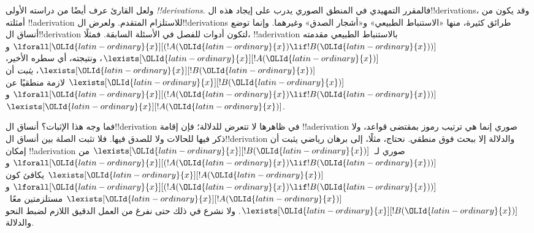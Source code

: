 \documentclass[../../../include/open-logic-section]{subfiles}
\begin{document}
ولعل القارئ عرف أيضًا من دراسته الأولى \emph{!!{derivation}s}.
فالمقرر التمهيدي في المنطق الصوري يدرب على إيجاد هذه
ال!!{derivation}s، وقد يكون من أمثلته !!a{derivation} للاستلزام
المتقدم. ولعرض ال!!{derivation}s طرائق كثيرة، منها «الاستنباط
الطبيعي» و«أشجار الصدق» وغيرهما. وإنما توضع أنساق ال!!{derivation}
لتكون أدوات للفصل في الأسئلة السابقة. فمثلًا، !!a{derivation}
بالاستنباط الطبيعي مقدمته
$\lforall[{\OLId{latin-ordinary}{x}}][(!A({\OLId{latin-ordinary}{x}}) \lif !B({\OLId{latin-ordinary}{x}}))]$ و$\lexists[{\OLId{latin-ordinary}{x}}][!A({\OLId{latin-ordinary}{x}})]$،
ونتيجته، أي سطره الأخير، $\lexists[{\OLId{latin-ordinary}{x}}][!B({\OLId{latin-ordinary}{x}})]$، \emph{يثبت} أن
$\lexists[{\OLId{latin-ordinary}{x}}][!B({\OLId{latin-ordinary}{x}})]$ لازمة منطقيًا عن
$\lforall[{\OLId{latin-ordinary}{x}}][(!A({\OLId{latin-ordinary}{x}}) \lif !B({\OLId{latin-ordinary}{x}}))]$ و$\lexists[{\OLId{latin-ordinary}{x}}][!A({\OLId{latin-ordinary}{x}})]$.

فما وجه هذا الإثبات؟ أنساق ال!!{derivation} في ظاهرها لا تتعرض
للدلالة؛ فإن إقامة !!a{derivation} صوري إنما هي ترتيب رموز بمقتضى
قواعد، ولا ذكر فيها للحالات ولا للصدق فيها. فلا تثبت الصلة بين
أنساق ال!!{derivation} والدلالة إلا ببحث فوق منطقي. نحتاج، مثلًا،
إلى برهان رياضي يثبت أن إمكان !!a{derivation} صوري
لـ~$\lexists[{\OLId{latin-ordinary}{x}}][!B({\OLId{latin-ordinary}{x}})]$ من
$\lforall[{\OLId{latin-ordinary}{x}}][(!A({\OLId{latin-ordinary}{x}}) \lif !B({\OLId{latin-ordinary}{x}}))]$ و$\lexists[{\OLId{latin-ordinary}{x}}][!A({\OLId{latin-ordinary}{x}})]$
يكافئ كون $\lforall[{\OLId{latin-ordinary}{x}}][(!A({\OLId{latin-ordinary}{x}}) \lif !B({\OLId{latin-ordinary}{x}}))]$ و
$\lexists[{\OLId{latin-ordinary}{x}}][!A({\OLId{latin-ordinary}{x}})]$ مستلزمتين معًا~$\lexists[{\OLId{latin-ordinary}{x}}][!B({\OLId{latin-ordinary}{x}})]$.
ولا نشرع في ذلك حتى نفرغ من العمل الدقيق اللازم لضبط النحو والدلالة.
\end{document}
